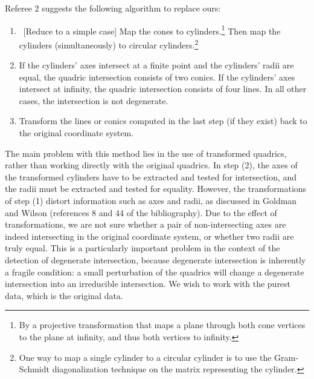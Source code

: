 \begin{letter}
Referee 2 suggests the following algorithm to replace ours:
\begin{enumerate}
\item
	\ [Reduce to a simple case] Map the cones to 
	cylinders.\footnote{By a projective transformation 
	that maps a plane through both cone vertices to the plane at
	infinity, and thus both vertices to infinity.}
	Then map the cylinders (simultaneously) to circular 
	cylinders.\footnote{One way to map a single cylinder 
	to a circular cylinder is to use
	the Gram-Schmidt diagonalization technique on the matrix
	representing the cylinder.}
\item
	If the cylinders' axes intersect at a finite point and the 
	cylinders' radii are equal, the quadric intersection consists
	of two conics.
	If the cylinders' axes intersect at infinity, 
	the quadric intersection consists
	of four lines.
	In all other cases, the intersection is not degenerate.
%
\item
	Transform the lines or conics
	computed in the last step (if they exist)
	back to the original coordinate system.
\end{enumerate}

\noindent The main problem with this method lies in the use of transformed 
quadrics, rather than working directly with the original quadrics.
In step (2), the axes of the transformed cylinders have to be extracted 
and tested for intersection, and the radii must be extracted and tested 
for equality.  
However, the transformations of step (1) 
distort information such as axes and radii,
as discussed in Goldman and Wilson (references 8 and 44 of the bibliography).
Due to the effect of transformations, we are not sure whether a pair
of non-intersecting axes are indeed intersecting in the original
coordinate system, or whether two radii are truly equal.
This is a particularly important problem in the context of the detection
of degenerate intersection, because degenerate intersection is inherently
a fragile condition: a small perturbation of the quadrics will change a
degenerate intersection into an irreducible intersection.
We wish to work with the purest data, which is the original data.


\end{letter}
